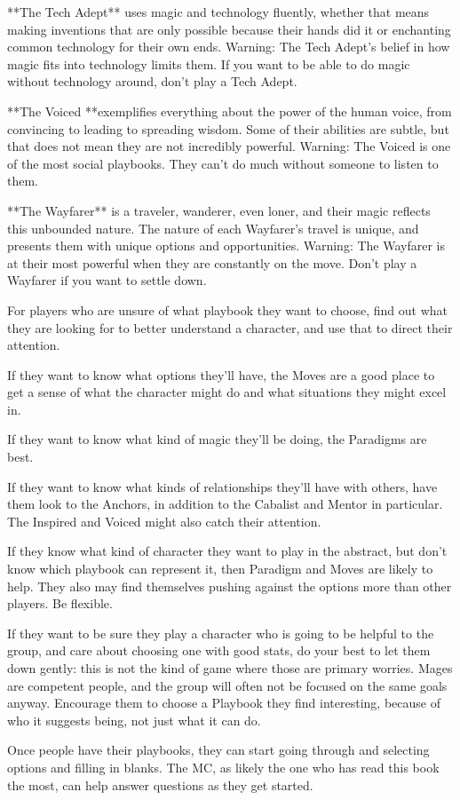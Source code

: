 \documentclass[
  oneside,
  statementpaper,
  9pt]{memoir}
\begin{document}
\begin{MC}
**The Tech Adept** uses magic and technology fluently, whether that means making inventions that are only possible because their hands did it or enchanting common technology for their own ends. Warning: The Tech Adept’s belief in how magic fits into technology limits them. If you want to be able to do magic without technology around, don’t play a Tech Adept.

**The Voiced **exemplifies everything about the power of the human voice, from convincing to leading to spreading wisdom. Some of their abilities are subtle, but that does not mean they are not incredibly powerful. Warning: The Voiced is one of the most social playbooks. They can’t do much without someone to listen to them.

**The Wayfarer** is a traveler, wanderer, even loner, and their magic reflects this unbounded nature. The nature of each Wayfarer’s travel is unique, and presents them with unique options and opportunities. Warning: The Wayfarer is at their most powerful when they are constantly on the move. Don’t play a Wayfarer if you want to settle down.

For players who are unsure of what playbook they want to choose, find out what they are looking for to better understand a character, and use that to direct their attention.

If they want to know what options they’ll have, the Moves are a good place to get a sense of what the character might do and what situations they might excel in.

If they want to know what kind of magic they’ll be doing, the Paradigms are best.

If they want to know what kinds of relationships they’ll have with others, have them look to the Anchors, in addition to the Cabalist and Mentor in particular. The Inspired and Voiced might also catch their attention.

If they know what kind of character they want to play in the abstract, but don’t know which playbook can represent it, then Paradigm and Moves are likely to help. They also may find themselves pushing against the options more than other players. Be flexible.

If they want to be sure they play a character who is going to be helpful to the group, and care about choosing one with good stats, do your best to let them down gently: this is not the kind of game where those are primary worries. Mages are competent people, and the group will often not be focused on the same goals anyway. Encourage them to choose a Playbook they find interesting, because of who it suggests being, not just what it can do.

Once people have their playbooks, they can start going through and selecting options and filling in blanks. The MC, as likely the one who has read this book the most, can help answer questions as they get started.

\end{MC}
\end{document}
